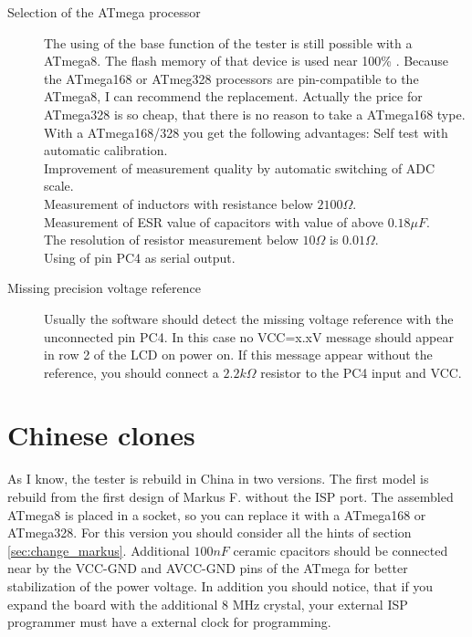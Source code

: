 \begin{description}
\item[Selection of the ATmega processor]
The using of the base function of the tester is still possible with a ATmega8.
The flash memory of that device is used near 100\% .
Because the ATmega168 or ATmeg328 processors are pin-compatible to the ATmega8,
I can recommend the replacement.
Actually the price for ATmega328 is so cheap, that there is no reason to take
a ATmega168 type.
With a ATmega168/328 you get the following advantages:
Self test with automatic calibration.\\
Improvement of measurement quality by automatic switching of ADC scale.\\
Measurement of inductors with resistance  below \(2100 \Omega\).\\
Measurement of ESR value of capacitors with value of above  \(0.18 \mu F\).\\
The resolution of resistor measurement below \(10 \Omega\) is \(0.01 \Omega\).\\
Using of pin PC4 as serial output.\\

\item[Missing precision voltage reference]
Usually the software should detect the missing voltage reference with the unconnected pin PC4.
In this case no VCC=x.xV message should appear in row 2 of the LCD on power on.
If this message appear without the reference, you should connect a \(2.2k \Omega\) resistor
to the PC4 input and VCC.


\end{description}

\section{Chinese clones}
As I know, the tester is rebuild in China in two versions.
The first model is rebuild from the first design of Markus F. without the ISP port.
The assembled ATmega8 is placed in a socket, so you can replace it with a ATmega168 or ATmega328.
For this version you should consider all the hints of section \ref{sec:change_markus}.
Additional \(100nF\) ceramic cpacitors should be connected near by the VCC-GND and AVCC-GND pins of
the ATmega for better stabilization of the power voltage.
In addition you should notice, that if you expand the board with the additional 8 MHz crystal,
your external ISP programmer must have a external clock for programming.\\

